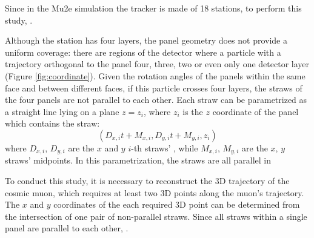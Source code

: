 Since in the Mu2e simulation the tracker is made of 18 stations, to 
perform this study, .
%

Although the station has  four layers, 
the panel geometry does not provide a uniform
 coverage: there are regions of the 
detector where a particle with a trajectory orthogonal
to the panel  four, three, two or even only one 
detector layer (Figure \ref{fig:coordinate}). Given the
rotation angles of the panels within the same 
face and between different faces, if this particle
crosses four layers, the straws of the four 
panels are not parallel to each other.
Each straw can be parametrized as a straight line 
lying on a plane $z = z_i$, where $z_i$ is the $z$ 
coordinate of the panel which contains the straw:
\begin{equation}\label{equaretta}
    (D_{x,i}t+M_{x,i},D_{y,i}t+M_{y,i},z_i)
\end{equation}
where $D_{x,i}$, $D_{y,i}$ are the $x$ and $y$ 
$i$-th straws' ,
%
while $M_{x,i}$, $M_{y,i}$ 
are the $x$, $y$ straws' midpoints.
In this parametrization, the straws  are all parallel 
in 

To conduct this study, it is necessary to 
reconstruct the 3D trajectory of the cosmic muon, 
which requires at least two 3D points along the muon's 
trajectory. The $x$ and $y$ coordinates of 
the each required 3D point can be determined 
from the intersection of one pair of non-parallel 
straws. Since all straws 
within a single panel are parallel to each other, 
.

